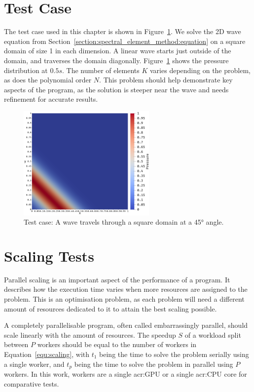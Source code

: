 \section{Test Case}\label{section:results:test_case}

The test case used in this chapter is shown in Figure~\ref{fig:problem}. We solve the 2D wave
equation from Section~\ref{section:spectral_element_method:equation} on a square domain of size 1 in
each dimension. A linear wave starts just outside of the domain, and traverses the domain
diagonally. Figure~\ref{fig:problem} shows the pressure distribution at \(0.5 s\). The number of
elements \( K \) varies depending on the problem, as does the polynomial order \( N \). This problem
should help demonstrate key aspects of the program, as the solution is steeper near the wave and
needs refinement for accurate results.

\begin{figure}[H]
	\centering
	\includegraphics[width=0.6\textwidth]{Chapter_results/media/problem_1}
	\caption{Test case: A wave travels through a square domain at a 45° angle.}\label{fig:problem}
\end{figure}

\section{Scaling Tests}\label{section:results:scaling_tests}

Parallel scaling is an important aspect of the performance of a program. It describes how the
execution time varies when more resources are assigned to the problem. This is an optimisation
problem, as each problem will need a different amount of resources dedicated to it to attain the
best scaling possible. 

A completely parallelisable program, often called embarrassingly parallel, should scale linearly
with the amount of resources. The speedup \(S\) of a workload split between \(P\) workers should be
equal to the number of workers in Equation~\ref{equ:scaling}, with \(t_1\) being the time to solve
the problem serially using a single worker, and \(t_p\) being the time to solve the problem in
parallel using \(P\) workers. In this work, workers are a single \acrshort{acr:GPU} or a single
\acrshort{acr:CPU} core for comparative tests.

